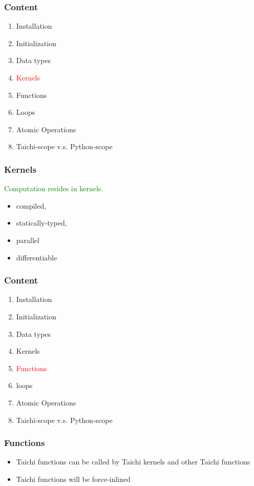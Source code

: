 \documentclass[serif,mathserif]{beamer}
\begin{document}
\begin{CJK}{UTF8}{gbsn}
\begin{frame}
  \frametitle{Content}
  \begin{enumerate}
  \item Installation
  \item Initialization
  \item Data types
  \item \textcolor{red}{Kernels}
  \item Functions
  \item Loops
  \item Atomic Operations
  \item Taichi-scope v.s. Python-scope
  \end{enumerate}
\end{frame}

\begin{frame}
  \frametitle{Kernels}
  \textcolor{green}{Computation resides in kernels.}
  \begin{itemize}
  \item compiled, 
  \item statically-typed, 
  \item parallel 
  \item differentiable
  \end{itemize}
  
\end{frame}

\begin{frame}
  \frametitle{Content}
  \begin{enumerate}
  \item Installation
  \item Initialization
  \item Data types
  \item Kernels
  \item \textcolor{red}{Functions}
  \item loops
  \item Atomic Operations
  \item Taichi-scope v.s. Python-scope
  \end{enumerate}
\end{frame}

\begin{frame}
  \frametitle{Functions}
  \begin{itemize}
  \item Taichi functions can be called by Taichi kernels and other Taichi functions
  \item Taichi functions will be force-inlined
  \end{itemize}


\end{frame}
\end{CJK}
\end{document}
